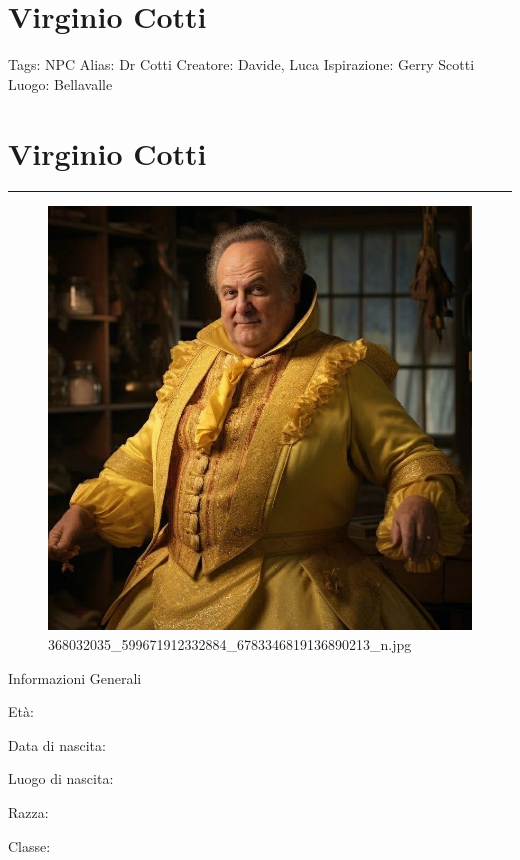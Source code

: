 \section{Virginio Cotti}\label{virginio-cotti}

Tags: NPC Alias: Dr Cotti Creatore: Davide, Luca Ispirazione: Gerry
Scotti Luogo: Bellavalle

\section{Virginio Cotti}\label{virginio-cotti-1}

\begin{center}\rule{0.5\linewidth}{0.5pt}\end{center}

\begin{figure}
\centering
\includegraphics{368032035_599671912332884_6783346819136890213_n.jpg}
\caption{368032035\_599671912332884\_6783346819136890213\_n.jpg}
\end{figure}

Informazioni Generali

Età:

Data di nascita:

Luogo di nascita:

Razza:

Classe:

